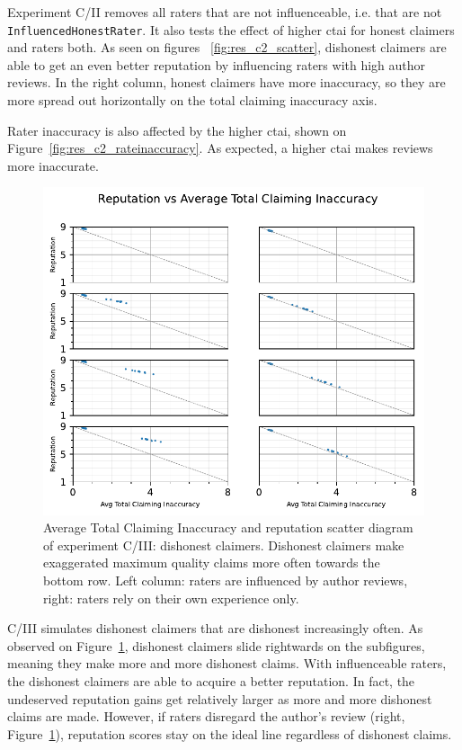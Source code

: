 \documentclass[%
    ]{\PathToTumTemplate/thesis/tum_thesis}
\begin{document}
Experiment C/II removes all raters that are not influenceable, i.e. that are not \texttt{InfluencedHonestRater}.
It also tests the effect of higher \gls{ctai} for honest claimers and raters both.
As seen on figures ~\ref{fig:res_c2_scatter}, dishonest claimers are able to get an even better reputation by influencing raters with high author reviews.
In the right column, honest claimers have more inaccuracy, so they are more spread out horizontally on the total claiming inaccuracy axis.

Rater inaccuracy is also affected by the higher \gls{ctai}, shown on Figure~\ref{fig:res_c2_rateinaccuracy}.
As expected, a higher \gls{ctai} makes reviews more inaccurate.

\begin{figure}[tbp]
  \begin{center}
        \includegraphics[width=0.75\linewidth]	{../results/c3/AvgTotClaimInaccuracyAndReputationScatter_joined.pdf}
    \caption{
    Average Total Claiming Inaccuracy and reputation scatter diagram of experiment C/III: dishonest claimers.
    Dishonest claimers make exaggerated maximum quality claims more often towards the bottom row.
    Left column: raters are influenced by author reviews, right: raters rely on their own experience only.
    }
    \label{fig:res_c3_scatter}
  \end{center}
\end{figure}

C/III simulates dishonest claimers that are dishonest increasingly often.
As observed on Figure~\ref{fig:res_c3_scatter}, dishonest claimers slide rightwards on the subfigures, meaning they make more and more dishonest claims.
With influenceable raters, the dishonest claimers are able to acquire a better reputation.
In fact, the undeserved reputation gains get relatively larger as more and more dishonest claims are made.
However, if raters disregard the author's review (right, Figure~\ref{fig:res_c3_scatter}), reputation scores stay on the ideal line regardless of dishonest claims.
\end{document}
